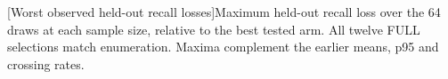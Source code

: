 \par\medskip\noindent\begin{minipage}{\linewidth}
\centering\captionsetup{hypcap=false}
[Worst observed held-out recall losses]{Maximum held-out recall loss over the 64 draws at each sample
size, relative to the best tested arm. All twelve FULL selections match
enumeration. Maxima complement the earlier means, p95 and crossing rates.}
\label{tab:7-budget-tails}
\footnotesize\setlength{\tabcolsep}{4pt}

\end{minipage}\par\medskip
